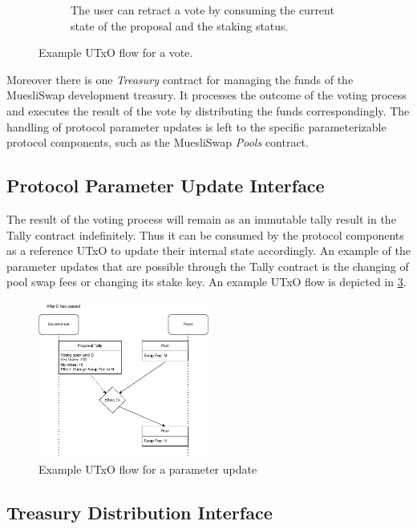\documentclass[11pt]{article}
\begin{document}
\begin{figure}
\begin{subfigure}[b]{0.5\textwidth}
        \caption{The user can retract a vote by consuming the current state of the proposal and the staking status.}
        \label{fig:utxo-flow-retract}
    \end{subfigure}
    \caption{Example UTxO flow for a vote.}
    \label{fig:utxo-flow-vote-complete}
\end{figure}

Moreover there is one \emph{Treasury} contract for managing the funds of the MuesliSwap development treasury.
It processes the outcome of the voting process and executes the result of the vote by distributing the funds correspondingly.
The handling of protocol parameter updates is left to the specific parameterizable protocol components,
such as the MuesliSwap \emph{Pools} contract.

\subsection{Protocol Parameter Update Interface}

The result of the voting process will remain as an immutable tally result in the Tally contract
indefinitely.
Thus it can be consumed by the protocol components as a reference UTxO to update their internal state accordingly.
An example of the parameter updates that are possible through the Tally contract is the changing of pool swap fees
or changing its stake key.
An example UTxO flow is depicted in \cref{fig:utxo-flow-params}.

\begin{figure}
    \centering
    \includegraphics[width=0.5\textwidth]{figures/pool-param-update.pdf}
    \caption{Example UTxO flow for a parameter update}
    \label{fig:utxo-flow-params}
\end{figure}

\subsection{Treasury Distribution Interface}
\end{document}
